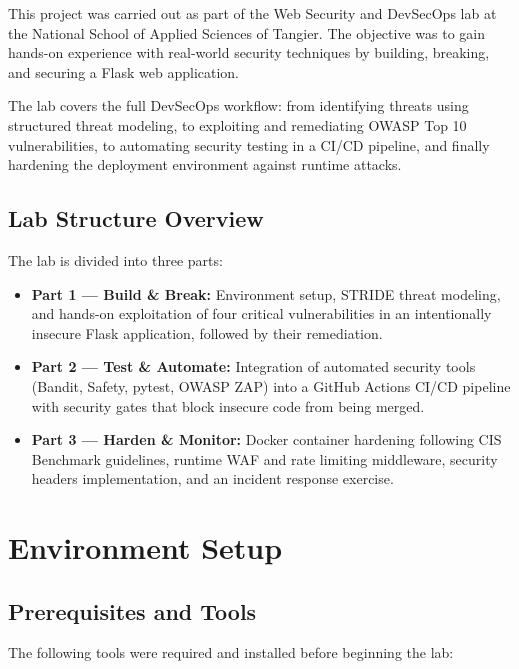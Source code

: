 \documentclass[12pt,a4paper]{report}
\begin{document}
This project was carried out as part of the Web Security and DevSecOps lab at the National School of Applied Sciences of Tangier. The objective was to gain hands-on experience with real-world security techniques by building, breaking, and securing a Flask web application.

The lab covers the full DevSecOps workflow: from identifying threats using structured threat modeling, to exploiting and remediating OWASP Top 10 vulnerabilities, to automating security testing in a CI/CD pipeline, and finally hardening the deployment environment against runtime attacks.

\section{Lab Structure Overview}

The lab is divided into three parts:

\begin{itemize}[leftmargin=1.5cm]
  \item \textbf{Part 1 — Build \& Break:} Environment setup, STRIDE threat modeling, and hands-on exploitation of four critical vulnerabilities in an intentionally insecure Flask application, followed by their remediation.
  \item \textbf{Part 2 — Test \& Automate:} Integration of automated security tools (Bandit, Safety, pytest, OWASP ZAP) into a GitHub Actions CI/CD pipeline with security gates that block insecure code from being merged.
  \item \textbf{Part 3 — Harden \& Monitor:} Docker container hardening following CIS Benchmark guidelines, runtime WAF and rate limiting middleware, security headers implementation, and an incident response exercise.
\end{itemize}

\chapter{Environment Setup}

\section{Prerequisites and Tools}

The following tools were required and installed before beginning the lab:
\end{document}
